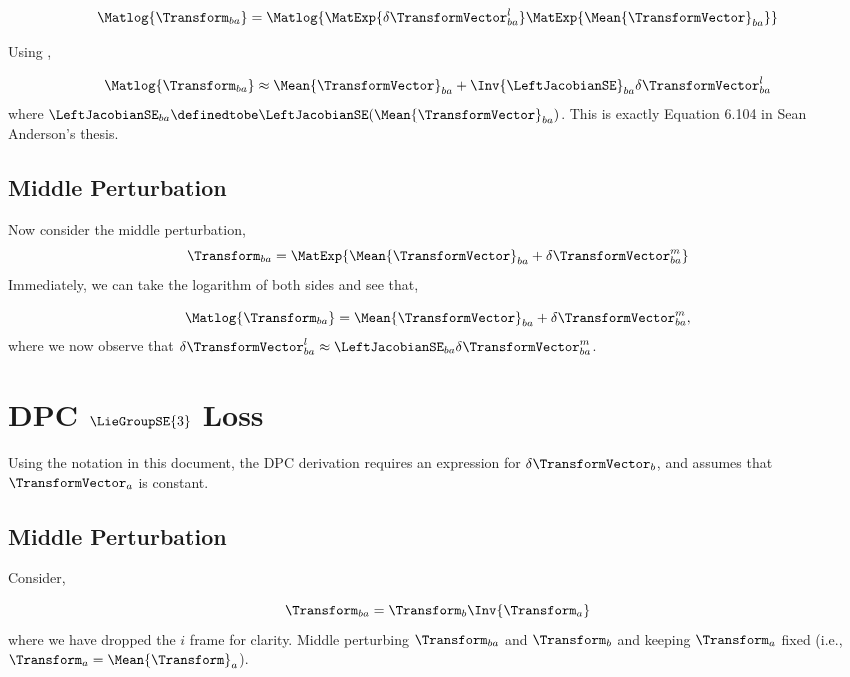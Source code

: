 \begin{equation}
	\Matlog{\Transform_{ba}} = \Matlog{\MatExp{\delta \TransformVector_{ba}^l} \MatExp{\Mean{\TransformVector}_{ba}}}
\end{equation}

Using ,

\begin{equation}
	\Matlog{\Transform_{ba}} \approx \Mean{\TransformVector}_{ba}
 + \Inv{\LeftJacobianSE}_{ba} \delta \TransformVector_{ba}^l
 \label{eq:left_perturb}
	\end{equation}
where $\LeftJacobianSE_{ba} \definedtobe \LeftJacobianSE(\Mean{\TransformVector}_{ba})$. This is exactly Equation 6.104 in Sean Anderson's thesis.



\subsection{Middle Perturbation}
Now consider the middle perturbation,
\begin{equation}
	\Transform_{ba} = \MatExp{\Mean{\TransformVector}_{ba} + \delta \TransformVector_{ba}^m}
\end{equation}
Immediately, we can take the logarithm of both sides and see that,

\begin{equation}
	\Matlog{\Transform_{ba}} = \Mean{\TransformVector}_{ba} + \delta \TransformVector_{ba}^m,
	\label{eq:middle_perturb}
\end{equation}
where we now observe that $\delta \TransformVector_{ba}^l \approx \LeftJacobianSE_{ba} \delta \TransformVector_{ba}^m$. 


\section{DPC $\LieGroupSE{3}$ Loss}
Using the notation in this document, the DPC derivation requires an expression for $\delta  \TransformVector_{b}$, and assumes that $\TransformVector_{a}$ is constant. 

\subsection{Middle Perturbation}


Consider,

\begin{equation}
	\Transform_{ba} = \Transform_{b} \Inv{\Transform_{a}}
\end{equation}
where we have dropped the $i$ frame for clarity. Middle perturbing $\Transform_{ba}$ and $\Transform_{b}$ and keeping $\Transform_{a}$ fixed (i.e., $\Transform_{a} = \Mean{\Transform}_{a}$).


